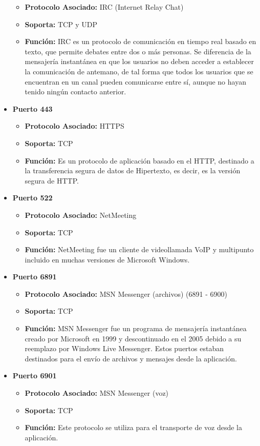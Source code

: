 \documentclass[a4paper,12pt]{article}
\begin{document}
\begin{itemize}
\begin{itemize}
  \item \textbf{Protocolo Asociado:} IRC (Internet Relay Chat)
  \item \textbf{Soporta:} TCP y UDP
  \item \textbf{Función:} IRC es un protocolo de comunicación en tiempo real basado en texto, que permite debates entre dos o más personas.
  Se diferencia de la mensajería instantánea en que los usuarios no deben acceder a establecer la comunicación de antemano, de tal forma que todos los usuarios
  que se encuentran en un canal pueden comunicarse entre sí, aunque no hayan tenido ningún contacto anterior.
 \end{itemize}
 \item \textbf{Puerto 443}
 \begin{itemize}
  \item \textbf{Protocolo Asociado:} HTTPS
  \item \textbf{Soporta:} TCP
  \item \textbf{Función:} Es un protocolo de aplicación basado en el HTTP, destinado a la transferencia segura de datos de Hipertexto, es decir, es la versión segura de
  HTTP.
 \end{itemize}
 \item \textbf{Puerto 522}
 \begin{itemize}
  \item \textbf{Protocolo Asociado:} NetMeeting
  \item \textbf{Soporta:} TCP
  \item \textbf{Función:} NetMeeting fue un cliente de videollamada VoIP y multipunto incluido en muchas versiones de Microsoft Windows.
 \end{itemize}
 \item \textbf{Puerto 6891}
 \begin{itemize}
  \item \textbf{Protocolo Asociado:} MSN Messenger (archivos) (6891 - 6900)
  \item \textbf{Soporta:} TCP
  \item \textbf{Función:} MSN Messenger fue un programa de mensajería instantánea creado por Microsoft en 1999 y descontinuado en el 2005 debido a su reemplazo
  por Windows Live Messenger. Estos puertos estaban destinados para el envío de archivos y mensajes desde la aplicación.
 \end{itemize}
 \item \textbf{Puerto 6901}
 \begin{itemize}
  \item \textbf{Protocolo Asociado:} MSN Messenger (voz)
  \item \textbf{Soporta:} TCP
  \item \textbf{Función:} Este protocolo se utiliza para el transporte de voz desde la aplicación.
 \end{itemize}














 
\end{itemize}
\end{document}
